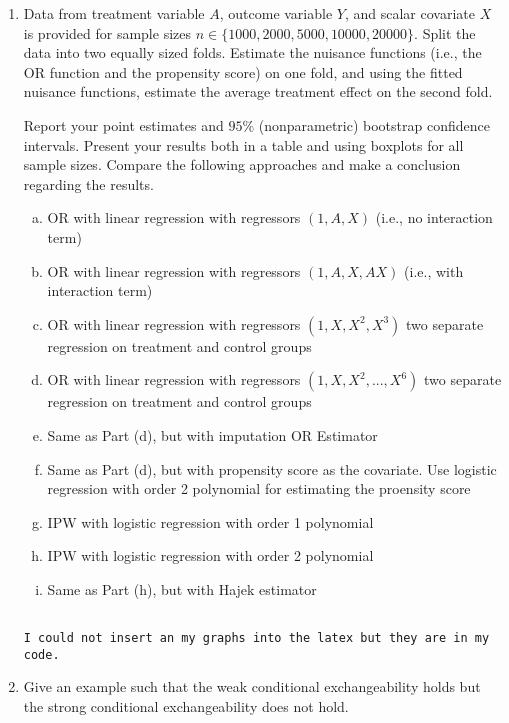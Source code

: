 \documentclass[10pt]{article}
\begin{document}
\begin{enumerate}

\item Data from treatment variable $A$, outcome variable $Y$, and scalar covariate $X$ is provided for sample sizes $n\in\{1000,2000,5000,10000,20000\}$. Split the data into two equally sized folds. Estimate the nuisance functions (i.e., the OR function and the propensity score) on one fold, and using the fitted nuisance functions, estimate the average treatment effect on the second fold. 

Report your point estimates and $95\%$ (nonparametric) bootstrap confidence intervals. Present your results both in a table and using boxplots for all sample sizes. Compare the following approaches and make a conclusion regarding the results.
\begin{enumerate}[(a)]
\item OR with linear regression with regressors $(1,A,X)$ (i.e., no interaction term)
\item OR with linear regression with regressors $(1,A,X,AX)$ (i.e., with interaction term)
\item OR with linear regression with regressors $(1,X,X^2,X^3)$ two separate regression on treatment and control groups
\item OR with linear regression with regressors $(1,X,X^2,...,X^6)$ two separate regression on treatment and control groups
\item Same as Part (d), but with imputation OR Estimator
\item Same as Part (d), but with propensity score as the covariate. Use logistic regression with order 2 polynomial for estimating the proensity score
\item IPW with logistic regression with order 1 polynomial
\item IPW with logistic regression with order 2 polynomial
\item Same as Part (h), but with Hajek estimator
\end{enumerate}

\begin{verbatim}

I could not insert an my graphs into the latex but they are in my code. 

\end{verbatim}


\item Give an example such that the weak conditional exchangeability holds but the strong conditional exchangeability does not hold.


\end{enumerate}
\end{document}
